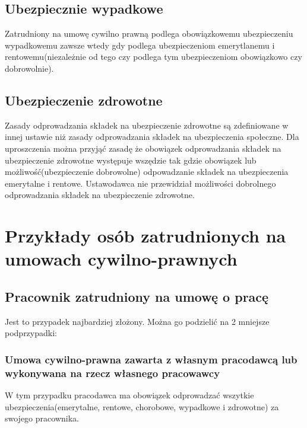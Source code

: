 \subsection[Ubezpiecznie wypadkowe][Ubezpiecznie wypadkowe]{Ubezpiecznie wypadkowe}
Zatrudniony na umowę cywilno prawną podlega obowiązkowemu ubezpieczeniu wypadkowemu zawsze wtedy gdy podlega ubezpieczeniom emerytlanemu i rentowemu(niezależnie od tego czy podlega tym ubezpieczeniom obowiązkowo czy dobrowolnie).

\subsection[Ubezpieczenie zdrowotne][Ubezpieczenie zdrowotne]{Ubezpieczenie zdrowotne}
Zasady odprowadzania składek na ubezpieczenie zdrowotne są zdefiniowane w innej ustawie niż zasady odprowadzania składek na ubezpieczenia społeczne. Dla uproszczenia można przyjąć zasadę że obowiązek odprowadzania składek na ubezpieczenie zdrowotne występuje wszędzie tak gdzie obowiązek lub możliwość(ubezpieczenie dobrowolne) odpowadzanie składek na ubezpieczenia emerytalne i rentowe. Ustawodawca nie przewidział możliwości dobrolnego odprowadzania składek na ubezpieczenie zdrowotne.

\section[Przykłady osób zatrudnionych na umowach cywilno-prawnych][Przykłady osób zatrudnionych na umowach cywilno-prawnych]{Przykłady osób zatrudnionych na umowach cywilno-prawnych}
\label{przykladyOsob}

\subsection[Pracownik zatrudniony na umowę o pracę][Pracownik zatrudniony na umowę o pracę]{Pracownik zatrudniony na umowę o pracę}
\label{umowaOPrace}
Jest to przypadek najbardziej złożony. Można go podzielić na 2 mniejsze podprzypadki:

\subsubsection{Umowa cywilno-prawna zawarta z własnym pracodawcą lub wykonywana na rzecz własnego pracowawcy}
W tym przypadku pracodawca ma obowiązek odprowadzać wszytkie ubezpieczenia(emerytalne, rentowe, chorobowe, wypadkowe i zdrowotne) za swojego pracownika.

